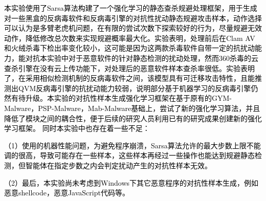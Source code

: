 
\begin{conclusion}

\textcolor{black}{本实验使用了Sarsa算法构建了一个强化学习的静态查杀规避处理框架，用于生成对一些黑盒的反病毒软件和反病毒引擎的对抗性扰动静态规避攻击样本，动作选择可以认为是多臂老虎机问题，在有限的尝试次数下探索较好的行为，尽量规避无效动作，降低修改总次数来实现规避概率最大化。实验表明，处理前后在Clam AV和火绒杀毒下检出率变化较小，这可能是因为这两款杀毒软件自带一定的抗扰动能力，能对抗本实验中对于恶意软件的针对静态检测的扰动处理，然而360杀毒的云查杀引擎在没有云上传功能下，对处理后的恶意软件样本查杀率很低。实验表明了，在采用相似检测机制的反病毒软件之间，该模型具有可迁移攻击特性，且能推测出QVM反病毒引擎的抗扰动能力较弱，说明部分基于机器学习的反病毒引擎仍然有待升级。本实验的对抗性样本生成强化学习框架在基于原有的GYM-Malware，PSP-Malware，Mab-Malware基础上，尝试了新的强化学习算法，并且降低了模块之间的耦合性，便于后续的研究人员利用已有的研究成果创建新的强化学习框架。}
\textcolor{black}{同时本实验中也存在着一些不足：}

\textcolor{black}{（1）使用的机器性能问题，为避免程序崩溃，Sarsa算法允许的最大步数上限不能调的很高，导致可能存在一些样本，这些样本再经过一些操作也能达到规避静态检测，但智能体在指定步数之内会判定扰动产生的对抗性样本无效。}

\textcolor{black}{（2）最后，本实验尚未考虑到Windows下其它恶意程序的对抗性样本生成，例如恶意shellcode，恶意JavaScript代码等。}
\end{conclusion}
